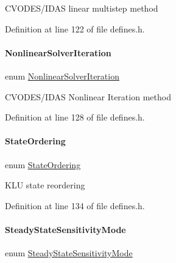 C\+V\+O\+D\+E\+S/\+I\+D\+AS linear multistep method 

Definition at line 122 of file defines.\+h.

\mbox{\label{namespaceamici_a13388d34e4c35bb592c3e821c35cc923}} 
\paragraph{\texorpdfstring{NonlinearSolverIteration}{NonlinearSolverIteration}}
{\footnotesize\ttfamily enum \mbox{\hyperlink{namespaceamici_a13388d34e4c35bb592c3e821c35cc923}{Nonlinear\+Solver\+Iteration}}\hspace{0.3cm}{\ttfamily [strong]}}

C\+V\+O\+D\+E\+S/\+I\+D\+AS Nonlinear Iteration method 

Definition at line 128 of file defines.\+h.

\mbox{\label{namespaceamici_a890d968060d6d830aeed98dbeb04447f}} 
\paragraph{\texorpdfstring{StateOrdering}{StateOrdering}}
{\footnotesize\ttfamily enum \mbox{\hyperlink{namespaceamici_a890d968060d6d830aeed98dbeb04447f}{State\+Ordering}}\hspace{0.3cm}{\ttfamily [strong]}}

K\+LU state reordering 

Definition at line 134 of file defines.\+h.

\mbox{\label{namespaceamici_a1f7d44f04185d57423d01d47d13470a6}} 
\paragraph{\texorpdfstring{SteadyStateSensitivityMode}{SteadyStateSensitivityMode}}
{\footnotesize\ttfamily enum \mbox{\hyperlink{namespaceamici_a1f7d44f04185d57423d01d47d13470a6}{Steady\+State\+Sensitivity\+Mode}}\hspace{0.3cm}{\ttfamily [strong]}}

